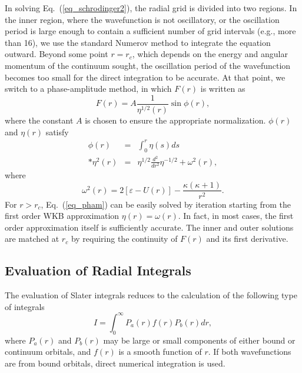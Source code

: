 In solving Eq.~(\ref{eq_schrodinger2}), the radial grid is divided into two
regions. In the inner region, where the wavefunction is not oscillatory, or
the oscillation period is large enough to contain a sufficient number of grid
intervals (e.g., more than 16), we use the standard Numerov method to
integrate the equation outward. Beyond some point $r = r_c$, which depends on
the energy and angular momentum of the continuum sought, the oscillation
period of the wavefunction becomes too small for the direct integration to be
accurate. At that point, we switch to a phase-amplitude method, in which
$F(r)$ is written as
\begin{equation}
F(r) = A\frac{1}{\eta^{1/2}(r)} \sin\phi(r),
\end{equation}
where the constant $A$ is chosen to ensure the appropriate normalization.
$\phi(r)$ and $\eta(r)$ satisfy  
\begin{eqnarray}
\label{eq_pham}
\phi(r) &=& \int_0^{r} \eta(s) d s \nonumber \\*
\eta^2(r) &=& \eta^{1/2}\frac{d^2}{d r^2}\eta^{-1/2} + \omega^2(r) ,
\end{eqnarray}
where
\begin{equation}
\omega^2(r) = 2\left[\varepsilon-U(r)\right] - 
\frac{\kappa(\kappa + 1)}{r^2} .
\end{equation}
For $r > r_c$, Eq.~(\ref{eq_pham}) can be easily solved by iteration
starting from the first order WKB approximation $\eta(r) = \omega(r)$. In
fact, in most cases, the first order approximation itself is sufficiently
accurate. The inner and outer solutions are matched at $r_c$ by requiring the
continuity of $F(r)$ and its first derivative. 

\subsection{Evaluation of Radial Integrals}
The evaluation of Slater integrals reduces to the calculation of the following
type of integrals 
\begin{equation}
I = \int_0^\infty P_a(r)f(r)P_b(r)d r,
\end{equation}
where $P_a(r)$ and $P_b(r)$ may be large or small components of either bound
or continuum orbitals, and $f(r)$ is a smooth function of $r$. If both
wavefunctions are from bound orbitals, direct numerical integration is
used. 

